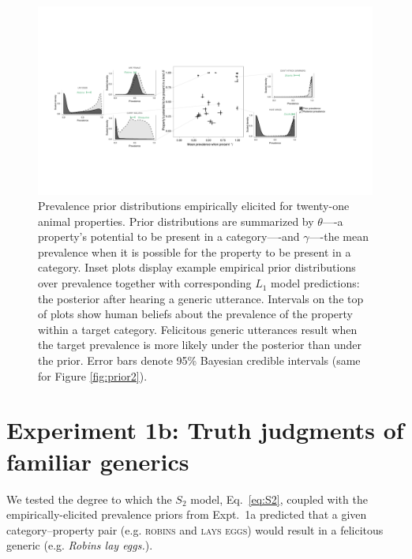 \documentclass[12pt,letterpaper]{article}
\newcommand{\ndg}[1]{\textcolor{Green}{[ndg: #1]}}
\begin{document}
%
\begin{figure}
\centering
    \includegraphics[width=\columnwidth]{prevalence-scatter-wDists_wide.pdf}
    \caption{Prevalence prior distributions empirically elicited for twenty-one animal properties.
    Prior distributions are summarized by $\theta$----a property's potential to be present in a category----and $\gamma$----the mean prevalence when it is possible for the property to be present in a category.
    Inset plots display example empirical prior distributions over prevalence together with corresponding $L_1$ model predictions: the posterior after hearing a generic utterance. 
    Intervals on the top of plots show human beliefs about the prevalence of the property within a target category.
    Felicitous generic utterances result when the target prevalence is more likely under the posterior than under the prior.
     Error bars denote 95\% Bayesian credible intervals (same for Figure \ref{fig:prior2}).
    }
  \label{fig:priors1a}
\end{figure}




\section*{Experiment 1b: Truth judgments of familiar generics}


We tested the degree to which the $S_2$ model, Eq.~\ref{eq:S2}, coupled with the empirically-elicited prevalence priors from Expt.~1a predicted that a given category--property pair (e.g. \textsc{robins} and \textsc{lays eggs}) would result in a felicitous generic (e.g. \emph{Robins lay eggs.}). 
\end{document}
